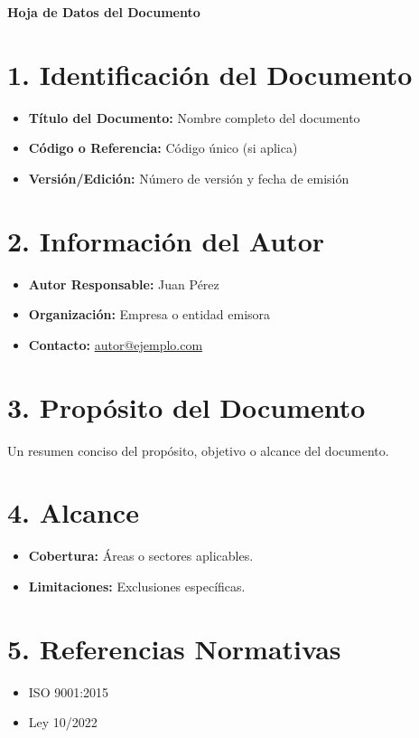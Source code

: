\documentclass[12pt,a4paper]{article}
\begin{document}
\begin{center}
    \LARGE\textbf{Hoja de Datos del Documento}
\end{center}

\vspace{1cm}

\section*{1. Identificación del Documento}
\begin{itemize}
    \item \textbf{Título del Documento:} Nombre completo del documento
    \item \textbf{Código o Referencia:} Código único (si aplica)
    \item \textbf{Versión/Edición:} Número de versión y fecha de emisión
\end{itemize}

\section*{2. Información del Autor}
\begin{itemize}
    \item \textbf{Autor Responsable:} Juan Pérez
    \item \textbf{Organización:} Empresa o entidad emisora
    \item \textbf{Contacto:} \href{mailto:autor@ejemplo.com}{autor@ejemplo.com}
\end{itemize}

\section*{3. Propósito del Documento}
Un resumen conciso del propósito, objetivo o alcance del documento.

\section*{4. Alcance}
\begin{itemize}
    \item \textbf{Cobertura:} Áreas o sectores aplicables.
    \item \textbf{Limitaciones:} Exclusiones específicas.
\end{itemize}

\section*{5. Referencias Normativas}
\begin{itemize}
    \item ISO 9001:2015
    \item Ley 10/2022
\end{itemize}
\end{document}
